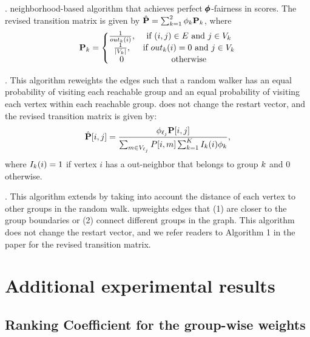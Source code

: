 \smallskip
\noindent 
\lfprn \citep{tsioutsiouliklis_fairness-aware_2021}. 
\Amatrix neighborhood-based algorithm that achieves perfect $\pmb{\phi}$-fairness in \pagerank scores. The revised transition matrix is given by $\hat{\mathbf{{P}}} = \sum_{k =1}^{2}\phi_k \mathbf{{P}}_k$, where 
\begin{equation}
    \transmatrix_\agroup =  \left\{\begin{matrix}
        \frac{1}{out_\agroup(i)}, &  \text{if } (i,j) \in E \text{ and } j \in \group_k \\
         \frac{1}{|\group_k|}, & \text{if } out_\agroup(i) = 0 \text{ and } j \in \group_k \\
         0 &  \text{otherwise} \\
\end{matrix}\right.
\end{equation}

\smallskip
\noindent 
\fairwalk \citep{rahman_fairwalk_2019}. 
This algorithm reweights the edges such that a random walker has an equal probability of visiting each reachable group and an equal probability of visiting each vertex within each reachable group. \fairwalk does not change the restart vector, and the revised transition matrix is given by:
\begin{equation}
\label{eq:fairwalk}
    \newtransmatrix[i,j] = \frac{\grouppr_{\labelof_j} \transmatrix[i,j]}{\sum_{m \in \group_{\labelof_j}}P[i,m] \sum_{\agroup =1}^{\nogroups} I_{\agroup}(i)\grouppr_\agroup} ,
\end{equation}
where $I_k(i) = 1$ if vertex $i$ has a out-neighbor that belongs to group $k$ and 0 otherwise.


\smallskip
\noindent 
\crosswalk \citep{khajehnejad_crosswalk_2022}. 
This algorithm extends \fairwalk by taking into account the distance of each vertex to other groups in the random walk. \crosswalk upweights edges that (1) are closer to the group boundaries or (2) connect different groups in the graph. This algorithm does not change the restart vector, and we refer readers to Algorithm 1 in the paper for the revised transition matrix. 


\section{Additional experimental results} 
\label{appendix:more-experiments}

\subsection{Ranking Coefficient for the group-wise \pagerank weights}

